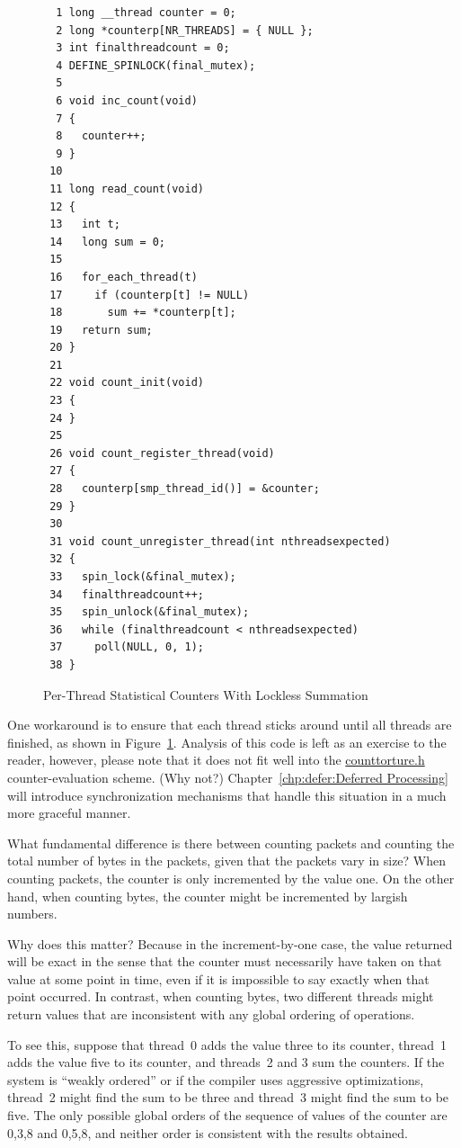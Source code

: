\begin{figure}[bp]
{ \scriptsize
\begin{verbatim}
  1 long __thread counter = 0;
  2 long *counterp[NR_THREADS] = { NULL };
  3 int finalthreadcount = 0;
  4 DEFINE_SPINLOCK(final_mutex);
  5 
  6 void inc_count(void)
  7 {
  8   counter++;
  9 }
 10 
 11 long read_count(void)
 12 {
 13   int t;
 14   long sum = 0;
 15 
 16   for_each_thread(t)
 17     if (counterp[t] != NULL)
 18       sum += *counterp[t];
 19   return sum;
 20 }
 21 
 22 void count_init(void)
 23 {
 24 }
 25 
 26 void count_register_thread(void)
 27 {
 28   counterp[smp_thread_id()] = &counter;
 29 }
 30 
 31 void count_unregister_thread(int nthreadsexpected)
 32 {
 33   spin_lock(&final_mutex);
 34   finalthreadcount++;
 35   spin_unlock(&final_mutex);
 36   while (finalthreadcount < nthreadsexpected)
 37     poll(NULL, 0, 1);
 38 }
\end{verbatim}
}
\caption{Per-Thread Statistical Counters With Lockless Summation}
\label{fig:count:Per-Thread Statistical Counters With Lockless Summation}
\end{figure}

	One workaround is to ensure that each thread sticks around
	until all threads are finished, as shown in
	Figure~\ref{fig:count:Per-Thread Statistical Counters With Lockless Summation}.
	Analysis of this code is left as an exercise to the reader,
	however, please note that it does not fit well into the
	\url{counttorture.h} counter-evaluation scheme.
	(Why not?)
	Chapter~\ref{chp:defer:Deferred Processing} will introduce 
	synchronization mechanisms that handle this situation in a much
	more graceful manner.

\QuickQ{}
	What fundamental difference is there between counting packets
	and counting the total number of bytes in the packets, given
	that the packets vary in size?
\QuickA{}
	When counting packets, the counter is only incremented by the
	value one.
	On the other hand, when counting bytes, the counter might
	be incremented by largish numbers.

	Why does this matter?
	Because in the increment-by-one case, the value returned will
	be exact in the sense that the counter must necessarily have
	taken on that value at some point in time, even if it is impossible
	to say exactly when that point occurred.
	In contrast, when counting bytes, two different threads might
	return values that are inconsistent with any global ordering
	of operations.

	To see this, suppose that thread~0 adds the value three to its
	counter, thread~1 adds the value five to its counter, and
	threads~2 and 3 sum the counters.
	If the system is ``weakly ordered'' or if the compiler
	uses aggressive optimizations, thread~2 might find the
	sum to be three and thread~3 might find the sum to be five.
	The only possible global orders of the sequence of values
	of the counter are 0,3,8 and 0,5,8, and neither order is
	consistent with the results obtained.

